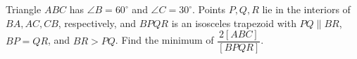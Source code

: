 Triangle $ABC$ has $\angle B=60^\circ$ and $\angle C=30^\circ$. Points $P,Q,R$ lie in the interiors of $BA,AC,CB$, respectively, and $BPQR$ is an isosceles trapezoid with $PQ\parallel BR$, $BP=QR$, and $BR>PQ$. Find the minimum of $\dfrac{2[ABC]}{[BPQR]}$.
